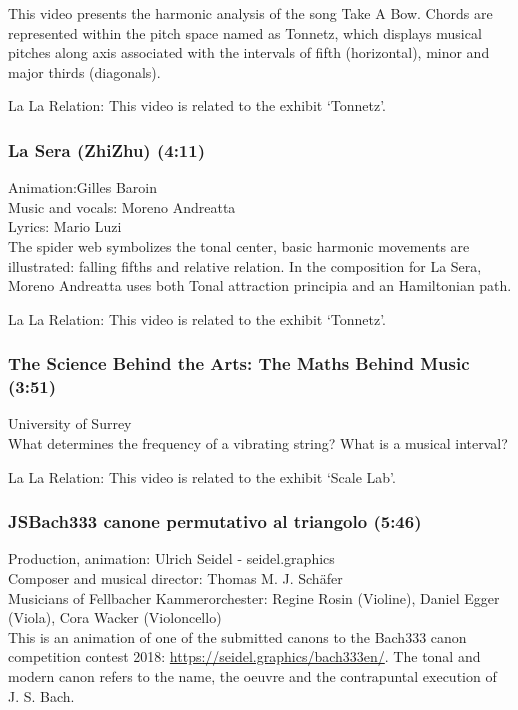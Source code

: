 This video presents the harmonic analysis of the song Take A Bow. Chords are represented within the pitch space named as Tonnetz, which displays musical pitches along axis associated with the intervals of fifth (horizontal), minor and major thirds (diagonals).

La La Relation: This video is related to the exhibit `Tonnetz'.

\subsubsection*{La Sera (ZhiZhu) (4:11)}
Animation:Gilles Baroin\\
Music and vocals: Moreno Andreatta\\
Lyrics: Mario Luzi\\

The spider web symbolizes the tonal center, basic harmonic movements are illustrated: falling fifths and relative relation. In the composition for La Sera, Moreno Andreatta uses both Tonal attraction principia and an Hamiltonian path.

La La Relation: This video is related to the exhibit `Tonnetz'.

\subsubsection*{The Science Behind the Arts: The Maths Behind Music (3:51)}
University of Surrey\\

What determines the frequency of a vibrating string? What is a musical interval?

La La Relation: This video is related to the exhibit `Scale Lab'.

\subsubsection*{JSBach333 canone permutativo al triangolo (5:46)}
Production, animation: Ulrich Seidel - seidel.graphics\\
Composer and musical director: Thomas M. J. Schäfer\\
Musicians of Fellbacher Kammerorchester: Regine Rosin (Violine), Daniel Egger (Viola), Cora Wacker (Violoncello) \\

This is an animation of one of the submitted canons to the Bach333 canon competition contest 2018: \url{https://seidel.graphics/bach333en/}. The tonal and modern canon refers to the name, the oeuvre and the contrapuntal execution of J. S. Bach.

